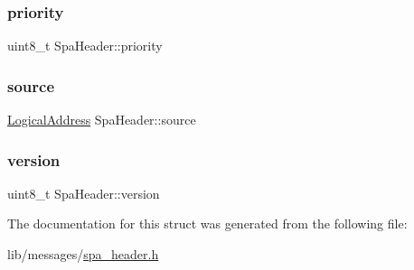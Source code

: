 \subsubsection{\texorpdfstring{priority}{priority}}
{\footnotesize\ttfamily uint8\+\_\+t Spa\+Header\+::priority}

\mbox{\label{structSpaHeader_ad30add6637ff3a67a3043861c7cee511}} 
\subsubsection{\texorpdfstring{source}{source}}
{\footnotesize\ttfamily \hyperlink{structLogicalAddress}{Logical\+Address} Spa\+Header\+::source}

\mbox{\label{structSpaHeader_ad0b9fa178a6b015fdfc312e1bd5fc927}} 
\subsubsection{\texorpdfstring{version}{version}}
{\footnotesize\ttfamily uint8\+\_\+t Spa\+Header\+::version}



The documentation for this struct was generated from the following file\+:\begin{DoxyCompactItemize}
\item 
lib/messages/\hyperlink{spa__header_8h}{spa\+\_\+header.\+h}\end{DoxyCompactItemize}
